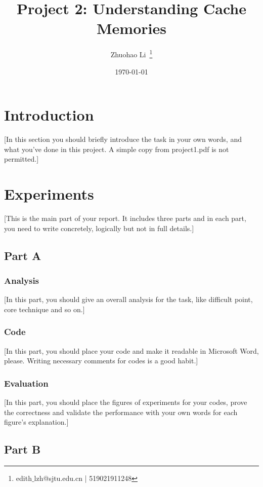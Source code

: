 \documentclass{article}
\title{\textbf{Project 2:  Understanding Cache Memories}} %
\author{Zhuohao Li~\textsuperscript{\Letter }\thanks{edith$\_$lzh@sjtu.edu.cn | 519021911248}}%
\date{\today} %
\begin{document}
\maketitle %

\section{Introduction}

[In this section you should briefly introduce the task in your own words, and what you’ve done in this project. A simple copy from project1.pdf is not permitted.] \\


\section{Experiments}

[This is the main part of your report. It includes three parts and in each part, you need to write concretely, logically but not in full details.]


\subsection{Part A}

\subsubsection{Analysis}

[In this part, you should give an overall analysis for the task, like difficult point, core technique and so on.]

\subsubsection{Code}

[In this part, you should place your code and make it readable in Microsoft Word, please. Writing necessary comments for codes is a good habit.]

\subsubsection{Evaluation}

[In this part, you should place the figures of experiments for your codes, prove the correctness and validate the performance with your own words for each figure’s explanation.]

\subsection{Part B}
\end{document}
